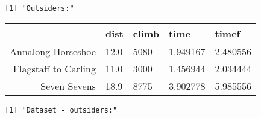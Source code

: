 \documentclass[11pt]{article}
\begin{document}
    \begin{Verbatim}[commandchars=\\\{\}]
[1] "Outsiders:"

    \end{Verbatim}

    \begin{tabular}{r|llll}
  & dist & climb & time & timef\\
\hline
	Annalong Horseshoe & 12.0     & 5080     & 1.949167 & 2.480556\\
	Flagstaff to Carling & 11.0     & 3000     & 1.456944 & 2.034444\\
	Seven Sevens & 18.9     & 8775     & 3.902778 & 5.985556\\
\end{tabular}


    
    \begin{Verbatim}[commandchars=\\\{\}]
[1] "Dataset - outsiders:"

    \end{Verbatim}
\end{document}

